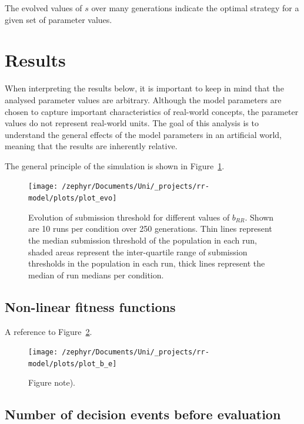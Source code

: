 \documentclass[british,,man,floatsintext]{apa6}
\begin{document}
The evolved values of \(s\) over many generations indicate the optimal strategy for a given set of parameter values.

\hypertarget{results}{%
\section{Results}\label{results}}

When interpreting the results below, it is important to keep in mind that the analysed parameter values are arbitrary.
Although the model parameters are chosen to capture important characteristics of real-world concepts, the parameter values do not represent real-world units.
The goal of this analysis is to understand the general effects of the model parameters in an artificial world, meaning that the results are inherently relative.

The general principle of the simulation is shown in Figure~\ref{fig:evoplot}.



\begin{figure}
\texttt{[image: /zephyr/Documents/Uni/\_projects/rr-model/plots/plot\_evo]} \caption{Evolution of submission threshold for different values of \(b_{RR}\). Shown are 10 runs per condition over 250 generations. Thin lines represent the median submission threshold of the population in each run, shaded areas represent the inter-quartile range of submission thresholds in the population in each run, thick lines represent the median of run medians per condition.}\label{fig:evoplot}
\end{figure}

\hypertarget{non-linear-fitness-functions-1}{%
\subsection{Non-linear fitness functions}\label{non-linear-fitness-functions-1}}

A reference to Figure~\ref{fig:epsilonplot}.



\begin{figure}
\texttt{[image: /zephyr/Documents/Uni/\_projects/rr-model/plots/plot\_b\_e]} \caption{Figure note).}\label{fig:epsilonplot}
\end{figure}

\hypertarget{number-of-decision-events-before-evaluation-1}{%
\subsection{Number of decision events before evaluation}\label{number-of-decision-events-before-evaluation-1}}
\end{document}
